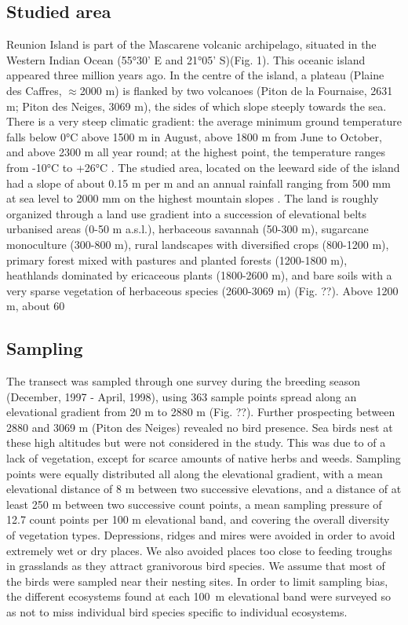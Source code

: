 \documentclass{article}\usepackage[]{graphicx}\usepackage[]{color}
\begin{document}
\subsection*{Studied area}
Reunion Island is part of the Mascarene volcanic archipelago, situated in the Western Indian Ocean (55°30’ E and 21°05’ S)(Fig. 1). This oceanic island appeared three million years ago. In the centre of the island, a plateau (Plaine des Caffres, $\approx$2000 m) is flanked by two volcanoes (Piton de la Fournaise, 2631 m; Piton des Neiges, 3069 m), the sides of which slope steeply towards the sea. There is a very steep climatic gradient: the average minimum ground temperature falls below 0°C above 1500 m in August, above 1800 m from June to October, and above 2300 m all year round; at the highest point, the temperature ranges from -10°C to +26°C \citep{Cadet1974,Raunet1991}.
The studied area, located on the leeward side of the island had a slope of about 0.15 m per m and an annual rainfall ranging from 500 mm at sea level to 2000 mm on the highest mountain slopes \cite{Raunet1991}. The land is roughly organized through a land use gradient into a succession of elevational belts \citep{Cadet1980} urbanised areas (0-50 m a.s.l.), herbaceous savannah (50-300 m), sugarcane monoculture (300-800 m), rural landscapes with diversified crops (800-1200 m), primary forest mixed with pastures and planted forests (1200-1800 m), heathlands dominated by ericaceous plants (1800-2600 m), and bare soils with a very sparse vegetation of herbaceous species (2600-3069 m) (Fig. ??). Above 1200 m, about 60 %

\subsection*{Sampling}


The transect was sampled through one survey during the breeding season (December, 1997 - April, 1998), using 363 sample points spread along an elevational gradient from 20 m to 2880 m (Fig. ??). Further prospecting between 2880 and 3069 m (Piton des Neiges) revealed no bird presence. Sea birds nest at these high altitudes but were not considered in the study. This was due to of a lack of vegetation, except for scarce amounts of native herbs and weeds. Sampling points were equally distributed all along the elevational gradient, with a mean elevational distance of 8 m between two successive elevations, and a distance of at least 250 m between two successive count points, a mean sampling pressure of 12.7 count points per 100 m elevational band, and covering the overall diversity of vegetation types. Depressions, ridges and mires were avoided in order to avoid extremely wet or dry places. We also avoided places too close to feeding troughs in grasslands as they attract granivorous bird species. We assume that most of the birds were sampled near their nesting sites. In order to limit sampling bias, the different ecosystems found at each 100~m elevational band were surveyed so as not to miss individual bird species specific to individual ecosystems. 
\end{document}
